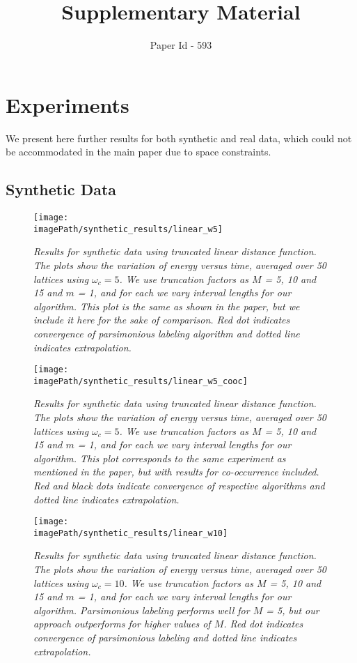 \documentclass[10pt,letterpaper]{article}
\newcommand{\mysection}[1]{\vspace{0mm}\section{#1}\vspace{0mm}}
\newcommand{\mysubsection}[1]{\vspace{0mm}\subsection{#1}\vspace{0mm}}
\newcommand{\mycaption}[1]{\vspace{0mm}\caption{#1}\vspace{0mm}}
\newcommand{\imagePath}{../../images}
\begin{document}
\title{Supplementary Material}
\author{Paper Id - 593}
\date{}
\maketitle

\mysection{Experiments} 

We present here further results for both synthetic and real data, which could not be accommodated in the main paper due to space constraints.

\mysubsection{Synthetic Data}
\vspace{2mm}

\begin{figure*}
\centerline{
\texttt{[image: \\imagePath/synthetic\_results/linear\_w5]}
}
\vspace{3mm}
\mycaption{\footnotesize \em Results for synthetic data using truncated linear distance function. The plots show the variation of energy versus time, averaged over 50 lattices using $\omega_c = 5$. We use truncation factors as $M$ = 5, 10 and 15  and $m$ = 1, and for each we vary interval lengths for our algorithm. This plot is the same as shown in the paper, but we include it here for the sake of comparison. Red dot indicates convergence of parsimonious labeling algorithm and dotted line indicates extrapolation.}
\label{fig:linear_weight5}
\end{figure*}

\begin{figure*}
\centerline{
\texttt{[image: \\imagePath/synthetic\_results/linear\_w5\_cooc]}
}
\vspace{3mm}
\mycaption{\footnotesize \em Results for synthetic data using truncated linear distance function. The plots show the variation of energy versus time, averaged over 50 lattices using $\omega_c = 5$. We use truncation factors as $M$ = 5, 10 and 15  and $m$ = 1, and for each we vary interval lengths for our algorithm. This plot corresponds to the same experiment as mentioned in the paper, but with results for co-occurrence included. Red and black dots indicate convergence of respective algorithms and dotted line indicates extrapolation.}
\label{fig:linear_weight5_cooc}
\end{figure*}

\begin{figure*}
\centerline{
\texttt{[image: \\imagePath/synthetic\_results/linear\_w10]}
}
\vspace{3mm}
\mycaption{\footnotesize \em Results for synthetic data using truncated linear distance function. The plots show the variation of energy versus time, averaged over 50 lattices using $\omega_c = 10$. We use truncation factors as $M$ = 5, 10 and 15  and $m$ = 1, and for each we vary interval lengths for our algorithm. Parsimonious labeling performs well for $M$ = 5, but our approach outperforms for higher values of $M$. Red dot indicates convergence of parsimonious labeling and dotted line indicates extrapolation.}
\label{fig:linear_weight10}
\end{figure*}
\end{document}
